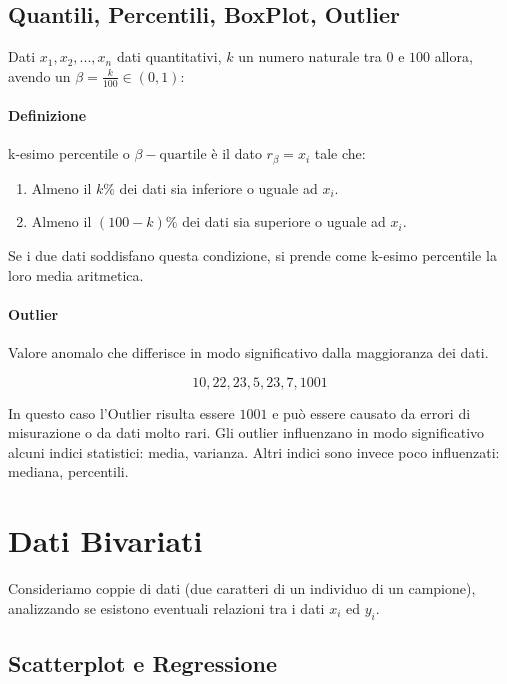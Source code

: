 \documentclass{article}
\begin{document}
\vspace*{5px}

\subsection{Quantili, Percentili, BoxPlot, Outlier}

Dati $x_{1}, x_{2}, ... , x_{n}$ dati quantitativi, $k$ un numero naturale tra $0$ e $100$ allora, avendo un $\beta = \frac{k}{100} \in (0,1)$:

\paragraph{Definizione} k-esimo percentile o $\beta-\text{quartile}$ è il dato $r_{\beta} = x_{i}$ tale che:

\begin{enumerate}
    \item Almeno il $k\%$ dei dati sia inferiore o uguale ad $x_{i}$.
    \item Almeno il $(100-k)\%$ dei dati sia superiore o uguale ad $x_{i}$.
\end{enumerate}

\newpage

Se i due dati soddisfano questa condizione, si prende come k-esimo percentile la loro media aritmetica.

\paragraph{Outlier} Valore anomalo che differisce in modo significativo dalla maggioranza dei dati.

\[ 10, 22, 23, 5, 23, 7, 1001 \]

In questo caso l'Outlier risulta essere $1001$ e può essere causato da errori di misurazione o da dati molto rari. Gli outlier influenzano in modo significativo alcuni indici statistici: media, varianza.
Altri indici sono invece poco influenzati: mediana, percentili.

\section{Dati Bivariati}

Consideriamo coppie di dati (due caratteri di un individuo di un campione), analizzando se esistono eventuali relazioni tra i dati $x_{i}$ ed $y_{i}$.

\subsection{Scatterplot e Regressione}
\end{document}
